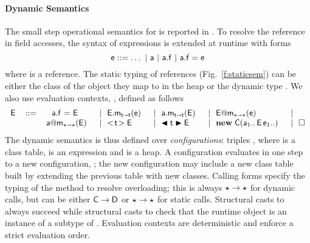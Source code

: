 \documentclass[acmlarge, anonymous, authordraft, review]{acmart} %
\begin{document}
\paragraph{Dynamic Semantics}
The small step operational semantics for \kafka is reported in
.  To resolve the \this reference in field accesses,
the syntax of expressions is extended at runtime with forms
%
\[ \e  ::= \dots \B \a \B \FReadR\a\f \B \FWriteR\a\f\e \]
%
where \a is a reference.  The static typing of references
(Fig.~\ref{f:staticsem}) can be either the class of the object they map to
in the heap \s or the dynamic type \any.
We also use evaluation contexts, \EE, defined as follows
\[
\begin{tabular}{llllllllllllllllll}
\EE &::=& ~ \FWriteR\a\f\EE   &\B  
        \KCall\EE\m\e\t\t  &\B
        \KCall\a\m{\EE}\t\t &\B
        \DynCall\EE\m\e   &\B\\
&       & \DynCall\a\m\EE   &\B
       \SubCast\t\EE  &\B
      \BehCast\t\EE  &\B
       \New\C{\a[1]..\,\EE\,\e[1]..} &\B 
      \EM{\square}
\end{tabular}
\]
\noindent
The dynamic semantics is thus defined over \emph{configurations}: triples
\K\e\s, where \K is a class table, \e is an expression and \s is a heap.  A
configuration evaluates in one step to a new configuration, \Reduce
\K\e\s\Kp\ep\sp; the new configuration may include a new class table built
by extending the previous table with new classes.
Calling forms specify the typing of the method to resolve overloading; this
is always \(\star \to \star\) for dynamic calls, but can be either \(\C \to
\D\) or \(\star \to \star\) for static calls.  Structural casts to \any always
succeed while structural casts to \C check that the runtime object is an
instance of a subtype of \C.  Evaluation contexts are deterministic and
enforce a strict evaluation order.
\end{document}
